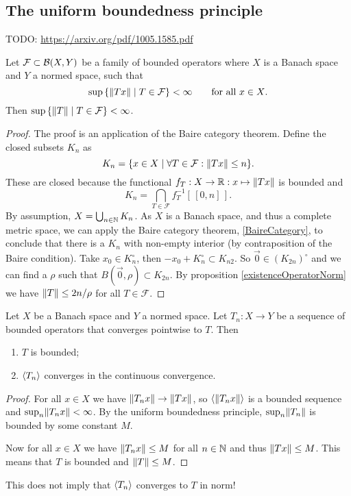 \subsection{The uniform boundedness principle}
TODO: \url{https://arxiv.org/pdf/1005.1585.pdf}

\begin{theorem} \label{uniformBoundednessPrinciple}
Let $\mathcal{F}\subset \operatorname{\mathcal{B}}(X,Y)$ be a family of bounded operators where $X$ is a Banach space and $Y$ a normed space, such that
\[ \sup\setbuilder{\norm{Tx}}{T\in\mathcal{F}} < \infty \qquad \text{for all $x\in X$}. \]
Then $\sup\setbuilder{\norm{T}}{T\in\mathcal{F}} < \infty$.
\end{theorem}
\begin{proof}
The proof is an application of the Baire category theorem. Define the closed subsets $K_n$ as
\[ K_n = \setbuilder{x\in X}{\forall T\in\mathcal{F}: \norm{Tx}\leq n}. \]
These are closed because the functional $f_T: X\to \mathbb{R}: x\mapsto \lVert Tx\rVert$ is bounded and
\[ K_n = \bigcap_{T\in\mathcal{F}}f_T^{-1}[\,[0,n]\,]. \]
By assumption, $X=\bigcup_{n\in\mathbb{N}} K_n$. As $X$ is a Banach space, and thus a complete metric space, we can apply the Baire category theorem, \ref{BaireCategory}, to conclude that there is a $K_n$ with non-empty interior (by contraposition of the Baire condition). Take $x_0\in K_n^\circ$, then $-x_0+K_n^\circ \subset K_{n2}$. So $\vec{0}\in (K_{2n})^\circ$ and we can find a $\rho$ such that $B(\vec{0},\rho)\subset K_{2n}$. By proposition \ref{existenceOperatorNorm} we have $\lVert T\rVert\leq 2n/\rho$ for all $T\in\mathcal{F}$.
\end{proof}
\begin{corollary} \label{BanachSteinhaus}
Let $X$ be a Banach space and $Y$ a normed space. Let $T_n: X\to Y$ be a sequence of bounded operators that converges pointwise to $T$. Then
\begin{enumerate}
\item $T$ is bounded;
\item $\left\langle T_n \right\rangle$ converges in the continuous convergence.
\end{enumerate}
\end{corollary}
\begin{proof}
For all $x\in X$ we have $\lVert T_nx\rVert \to \lVert Tx\rVert$, so $\left\langle \lVert T_nx\rVert \right\rangle$ is a bounded sequence and $\sup_{n}\lVert T_nx\rVert <\infty$. By the uniform boundedness principle, $\sup_{n}\lVert T_n\rVert$ is bounded by some constant $M$.

Now for all $x\in X$ we have $\lVert T_nx\rVert \leq M$ for all $n\in\mathbb{N}$ and thus $\lVert Tx\rVert\leq M$. This means that $T$ is bounded and $\lVert T\rVert \leq M$.
\end{proof}
This does not imply that $\left\langle T_n \right\rangle$ converges to $T$ in norm!

